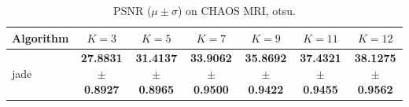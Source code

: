 \begin{table}[htbp]
\centering
\caption{PSNR ($\mu \pm \sigma$) on CHAOS MRI, otsu.}
\label{tab:exp2-otsu-psnr}
\begin{tabular}{lcccccc}
\toprule
Algorithm & $K=3$ & $K=5$ & $K=7$ & $K=9$ & $K=11$ & $K=12$ \\
\midrule
jade & \textbf{27.8831 $\pm$ 0.8927} & \textbf{31.4137 $\pm$ 0.8965} & \textbf{33.9062 $\pm$ 0.9500} & \textbf{35.8692 $\pm$ 0.9422} & \textbf{37.4321 $\pm$ 0.9455} & \textbf{38.1275 $\pm$ 0.9562} \\
\bottomrule
\end{tabular}
\end{table}